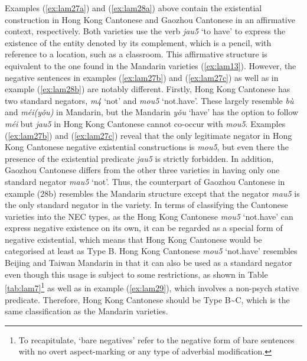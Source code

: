 \documentclass[output=paper]{langscibook}
\begin{document}
Examples (\ref{ex:lam27a}) and (\ref{ex:lam28a}) above contain the existential construction in Hong Kong Cantonese and Gaozhou Cantonese in an affirmative context, respectively. Both varieties use the verb \textit{jau5} `to have' to express the existence of the entity denoted by its complement, which is a pencil, with reference to a location, such as a classroom. This affirmative structure is equivalent to the one found in the Mandarin varieties (\ref{ex:lam13}). However, the negative sentences in examples (\ref{ex:lam27b}) and (\ref{ex:lam27c}) as well as in example (\ref{ex:lam28b}) are notably different. Firstly, Hong Kong Cantonese has two standard negators, \textit{m4} `not' and \textit{mou5} `not.have'. These largely resemble \textit{bù} and \textit{méi(yǒu)} in Mandarin, but the Mandarin \textit{yǒu} `have' has the option to follow \textit{méi} but \textit{jau5} in Hong Kong Cantonese cannot co-occur with \textit{mou5}. Examples (\ref{ex:lam27b}) and (\ref{ex:lam27c}) reveal that the only legitimate negator in Hong Kong Cantonese negative existential constructions is \textit{mou5}, but even there the presence of the existential predicate \textit{jau5} is strictly forbidden. In addition, Gaozhou Cantonese differs from the other three varieties in having only one standard negator \textit{mau5} `not'. Thus, the counterpart of Gaozhou Cantonese in example (28b) resembles the Mandarin structure except that the negator \textit{mau5} is the only standard negator in the variety. In terms of classifying the Cantonese varieties into the NEC types, as the Hong Kong Cantonese \textit{mou5} `not.have' can express negative existence on its own, it can be regarded as a special form of negative existential, which means that Hong Kong Cantonese would be categorised at least as Type B. Hong Kong Cantonese \textit{mou5} `not.have' resembles Beijing and Taiwan Mandarin in that it can also be used as a standard negator even though this usage is subject to some restrictions, as shown in Table \ref{tab:lam7}\footnote{To recapitulate, `bare negatives' refer to the negative form of bare sentences with no overt aspect-marking or any type of adverbial modification.} as well as in example (\ref{ex:lam29}), which involves a non-psych stative predicate. Therefore, Hong Kong Cantonese should be Type B\sim C, which is the same classification as the Mandarin varieties. 
\end{document}
